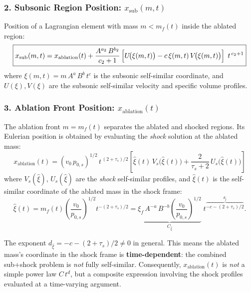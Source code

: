 \documentclass[11pt]{article}
\begin{document}
\subsubsection{2. Subsonic Region Position: $x_{\mathrm{sub}}(m,t)$}

Position of a Lagrangian element with mass $m < m_f(t)$ inside the ablated region:
\begin{equation}
  \boxed{
  x_{\mathrm{sub}}(m,t)
  = x_{\mathrm{ablation}}(t)
  + \frac{A^{a_2}\,B^{b_2}}{c_2+1}\,
    \Bigl[U\!\bigl(\xi(m,t)\bigr) - c\,\xi(m,t)\,V\!\bigl(\xi(m,t)\bigr)\Bigr]\;\,t^{\,c_2+1}}
  \label{eq:x_sub}
\end{equation}
where $\xi(m,t) = m\,A^{a}\,B^{b}\,t^{c}$ is the subsonic self-similar coordinate, and $U(\xi), V(\xi)$ are the subsonic self-similar velocity and specific volume profiles.

\subsubsection{3. Ablation Front Position: $x_{\mathrm{ablation}}(t)$}

The ablation front $m = m_f(t)$ separates the ablated and shocked regions.
Its Eulerian position is obtained by evaluating the \emph{shock} solution at the ablated mass:
\begin{equation}
  \boxed{
  x_{\mathrm{ablation}}(t) = \left(v_0\,p_{0,s}\right)^{1/2}\,t^{\,(2+\tau_s)/2}
    \left[\hat{\xi}(t)\,V_s\!\bigl(\hat{\xi}(t)\bigr) + \frac{2}{\tau_s+2}\,U_s\!\bigl(\hat{\xi}(t)\bigr)\right]}
  \label{eq:x_ablation}
\end{equation}
where $V_s(\hat{\xi})$, $U_s(\hat{\xi})$ are the \emph{shock} self-similar profiles, and $\hat{\xi}(t)$ is the self-similar coordinate of the ablated mass in the shock frame:
\begin{equation}
  \hat{\xi}(t) = m_f(t)\left(\frac{v_0}{p_{0,s}}\right)^{1/2} t^{-(2+\tau_s)/2}
  = \underbrace{\xi_f\,A^{-a}\,B^{-b}\left(\frac{v_0}{p_{0,s}}\right)^{1/2}}_{C_{\hat{\xi}}}\;
  t^{\overbrace{-c - (2+\tau_s)/2}^{d_{\hat{\xi}}}}.
  \label{eq:xsi_mf}
\end{equation}

\begin{notebox}
The exponent $d_{\hat{\xi}} = -c-(2+\tau_s)/2 \neq 0$ in general. This means the ablated mass's coordinate in the shock frame is \textbf{time-dependent}: the combined sub+shock problem is \emph{not} fully self-similar. Consequently, $x_{\mathrm{ablation}}(t)$ is \emph{not} a simple power law $C\,t^d$, but a composite expression involving the shock profiles evaluated at a time-varying argument.
\end{notebox}
\end{document}
